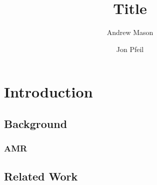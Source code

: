 \documentclass[12pt]{article}
\title{Title}
\author{Andrew Mason \and Jon Pfeil}
\begin{document}
\maketitle
\tableofcontents

\section{Introduction}
\subsection{Background}
\subsubsection{AMR}
\subsection{Related Work}
\end{document}
